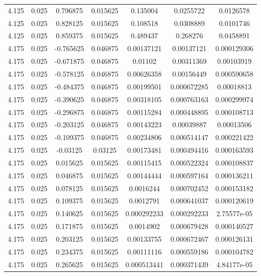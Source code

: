 \begin{table}[bh]
\begin{center}
{\begin{tabular}{ccccccc}
4.125	 & 0.025 & 	0.796875	 & 0.015625	 & 0.135004	 & 0.0255722	 & 0.0126578 \\ 
4.125	 & 0.025 & 	0.828125	 & 0.015625	 & 0.108518	 & 0.0308889	 & 0.0101746 \\ 
4.125	 & 0.025 & 	0.859375	 & 0.015625	 & 0.489437	 & 0.268276	 & 0.0458891 \\ 
4.175	 & 0.025 & 	-0.765625	 & 0.046875	 & 0.00137121	 & 0.00137121	 & 0.000129306 \\ 
4.175	 & 0.025 & 	-0.671875	 & 0.046875	 & 0.01102	 & 0.00311369	 & 0.00103919 \\ 
4.175	 & 0.025 & 	-0.578125	 & 0.046875	 & 0.00626358	 & 0.00156449	 & 0.000590658 \\ 
4.175	 & 0.025 & 	-0.484375	 & 0.046875	 & 0.00199501	 & 0.000672285	 & 0.00018813 \\ 
4.175	 & 0.025 & 	-0.390625	 & 0.046875	 & 0.00318105	 & 0.000763163	 & 0.000299974 \\ 
4.175	 & 0.025 & 	-0.296875	 & 0.046875	 & 0.00115284	 & 0.000448895	 & 0.000108713 \\ 
4.175	 & 0.025 & 	-0.203125	 & 0.046875	 & 0.00143223	 & 0.00039887	 & 0.00013506 \\ 
4.175	 & 0.025 & 	-0.109375	 & 0.046875	 & 0.00234806	 & 0.000514147	 & 0.000221422 \\ 
4.175	 & 0.025 & 	-0.03125	 & 0.03125	 & 0.00173481	 & 0.000494416	 & 0.000163593 \\ 
4.175	 & 0.025 & 	0.015625	 & 0.015625	 & 0.00115415	 & 0.000522324	 & 0.000108837 \\ 
4.175	 & 0.025 & 	0.046875	 & 0.015625	 & 0.00144444	 & 0.000597164	 & 0.000136211 \\ 
4.175	 & 0.025 & 	0.078125	 & 0.015625	 & 0.0016244	 & 0.000702452	 & 0.000153182 \\ 
4.175	 & 0.025 & 	0.109375	 & 0.015625	 & 0.0012791	 & 0.000641037	 & 0.000120619 \\ 
4.175	 & 0.025 & 	0.140625	 & 0.015625	 & 0.000292233	 & 0.000292233	 & 2.75577e-05 \\ 
4.175	 & 0.025 & 	0.171875	 & 0.015625	 & 0.0014902	 & 0.000679428	 & 0.000140527 \\ 
4.175	 & 0.025 & 	0.203125	 & 0.015625	 & 0.00133755	 & 0.000672467	 & 0.000126131 \\ 
4.175	 & 0.025 & 	0.234375	 & 0.015625	 & 0.00111116	 & 0.000559186	 & 0.000104782 \\ 
4.175	 & 0.025 & 	0.265625	 & 0.015625	 & 0.000513441	 & 0.000371439	 & 4.84177e-05 \\ 

\end{tabular}}
\end{center}
\end{table}

